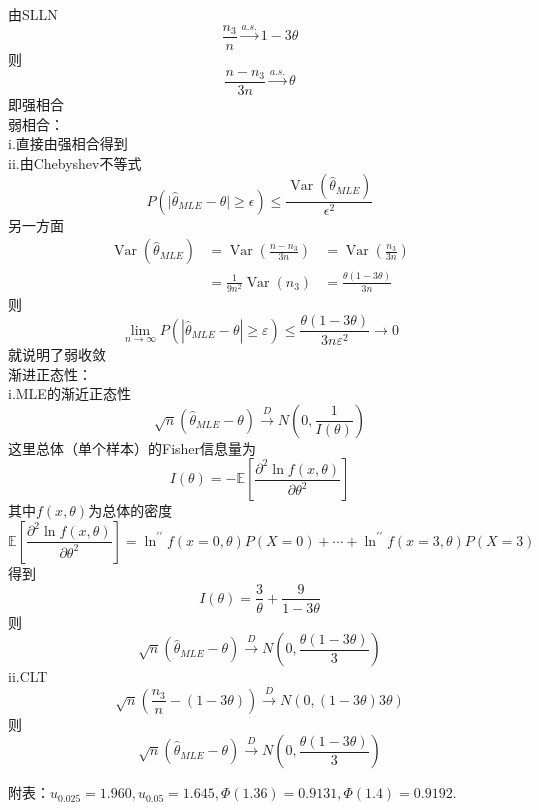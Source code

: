 \documentclass[UTF8]{ctexart}
\begin{document}
由SLLN
\[
\frac{n_3}{n} \xrightarrow{a.s.}1-3\theta
\]
则
\[
\frac{n-n_3}{3n} \xrightarrow{a.s.}\theta
\]
即强相合\\
弱相合：\\
i.直接由强相合得到\\
ii.由Chebyshev不等式
\[
P\left(\mid \hat{\theta}_{MLE}-\theta \mid \ge \epsilon \right)\le \frac{\operatorname{Var}\left( \hat{\theta}_{MLE}\right) }{\epsilon^2} 
\]
另一方面
\[
\begin{aligned}
	\operatorname{Var}(\hat{\theta}_{MLE})&=\operatorname{Var}\left(\frac{n-n_3}{3 n}\right)  &=\operatorname{Var}\left(\frac{n_3}{3 n}\right)\\
	&=\frac{1}{9 n^2}\operatorname{Var}\left(n_3\right)&=\frac{\theta(1-3 \theta)}{3 n}
\end{aligned}
\]
则
\[
\lim _{n \rightarrow \infty} P(|\hat{\theta}_{MLE}-\theta| \geq \varepsilon) \leqslant \frac{\theta(1-3 \theta)}{3 n \varepsilon^2} \rightarrow 0
\]
就说明了弱收敛\\
渐进正态性：\\
i.MLE的渐近正态性
\[
\sqrt{n}\left(\hat{\theta}_{MLE}-\theta \right)\xrightarrow{D} N\left(0,\frac{1}{I(\theta)} \right)  
\]
这里总体（单个样本）的Fisher信息量为
\[
I(\theta)=-\mathbb{E}[\frac{\partial^2 \ln f(x, \theta)}{\partial \theta^2}]
\]
其中$f(x, \theta)$为总体的密度
\[
\mathbb{E}[\frac{\partial^2 \ln f(x, \theta)}{\partial \theta^2}]=\ln ^{\prime \prime} f(x=0, \theta) P(X=0)+\cdots+\ln ^{\prime \prime} f(x=3, \theta) P(X=3)
\]
得到
\[
I(\theta)=\frac{3}{\theta}+\frac{9}{1-3\theta}
\]
则
\[
\sqrt{n}\left(\hat{\theta}_{MLE}-\theta \right)\xrightarrow{D} N\left(0,\frac{\theta(1-3\theta)}{3} \right) 
\]
ii.CLT
\[
\sqrt{n}\left(\frac{n_3}{n}-(1-3 \theta)\right) \xrightarrow{D} N(0,(1-3 \theta) 3 \theta) 
\]
则
\[
\sqrt{n}\left(\hat{\theta}_{MLE}-\theta \right)\xrightarrow{D} N\left(0,\frac{\theta(1-3\theta)}{3} \right) 
\]


\noindent 附表：$u_{0.025}=1.960, u_{0.05}=1.645, \Phi(1.36)=0.9131, \Phi(1.4)=0.9192$.
\end{document}
